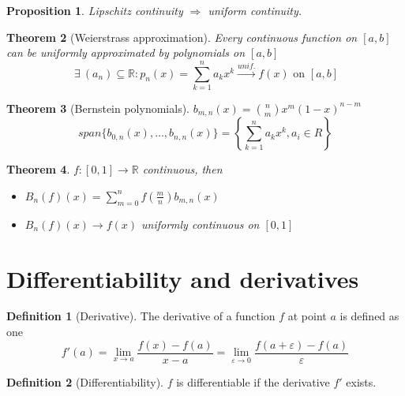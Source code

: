 \documentclass{article}
\newcommand{\DS}{\displaystyle}
\newcommand{\Ar}{\Rightarrow}
\newcommand{\f}[3]{#1 : #2 \rightarrow #3}
\newcommand{\intcc}[1]{\left[#1\right]}
\newcommand{\lime}{\lim_{\varepsilon \to 0}}
\newcommand{\limx}[1]{\lim_{x \to #1}}
\newcommand{\tounif}{\xrightarrow{unif.}}
\theoremstyle{definition}
\newtheorem{definition}{Definition}[section]
\theoremstyle{definition}
\theoremstyle{plain}
\newtheorem{theorem}{Theorem}[section]
\theoremstyle{plain}
\theoremstyle{plain}
\theoremstyle{plain}
\newtheorem{proposition}[theorem]{Proposition}
\theoremstyle{definition}
\theoremstyle{remark}
\theoremstyle{remark}
\theoremstyle{remark}
\theoremstyle{remark}
\newcommand{\R}{\mathbb{R}}
\newcommand{\sumn}{\sum_{k=1}^n}
\newcommand{\Exists}{\ \exists \ }
\newcommand{\E}{\varepsilon}
\begin{document}
\begin{proposition}
  Lipschitz continuity $\Ar$ uniform continuity.
\end{proposition}




\begin{theorem}[Weierstrass approximation]
  Every continuous function on $\intcc{a,b}$ can be uniformly approximated by polynomials on $\intcc{a,b}$
  \[
  \Exists (a_n) \subseteq \R : p_n(x) = \sumn a_k x^k \tounif f(x) \text{ on } \intcc{a,b}
  \]
\end{theorem}


\begin{theorem}[Bernstein polynomials]
  $b_{m,n}(x) = \binom{n}{m} x^m (1-x)^{n-m}$
  \[
  span \{ b_{0,n}(x), \hdots, b_{n,n}(x) \} =
  \left\{ \sumn a_k x^k, a_i \in R \right\}
  \]
\end{theorem}



\begin{theorem}
  $\f{f}{\intcc{0,1}}{\R}$ continuous, then
  \begin{itemize}
  \item $\DS B_n(f)(x) = \sum_{m=0}^{n} f(\frac{m}{n}) b_{m,n}(x)$
  \item $B_n(f)(x) \to f(x)$ uniformly continuous on $\intcc{0,1}$
  \end{itemize}
\end{theorem}


\section{Differentiability and derivatives}


\begin{definition}[Derivative]
  The derivative of a function $f$ at point $a$ is defined as one
  \[
  f'(a) = \limx{a} \frac{f(x)-f(a)}{x-a} = \lime \frac{f(a+\E)-f(a)}{\E}
  \]
\end{definition}


\begin{definition}[Differentiability]
  $f$ is differentiable if the derivative $f'$ exists.
\end{definition}
\end{document}
